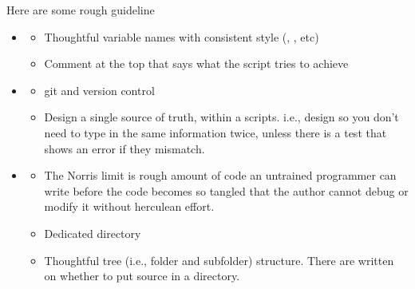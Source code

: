 \documentclass[letterpaper,10pt,english]{sphinxmanual}
\begin{document}
\sphinxAtStartPar
Here are some rough guideline
\begin{itemize}
\item {} \begin{description}
\begin{itemize}
\item {} 
\sphinxAtStartPar
Thoughtful variable names with consistent style (, , etc)

\item {} 
\sphinxAtStartPar
Comment at the top that says what the script tries to achieve

\end{itemize}

\end{description}

\item {} \begin{description}
\begin{itemize}
\item {} 
\sphinxAtStartPar
git and version control

\item {} 
\sphinxAtStartPar
Design a single source of truth, within a scripts. i.e., design so you don’t need to type in the same information twice, unless there is a test that shows an error if they mismatch.

\end{itemize}

\end{description}

\item {} \begin{description}
\begin{itemize}
\item {} 
\sphinxAtStartPar
The Norris limit is rough amount of code an untrained programmer can write before the code becomes so tangled that the author cannot debug or modify it without herculean effort.

\item {} 
\sphinxAtStartPar
Dedicated  directory

\item {} 
\sphinxAtStartPar
Thoughtful tree (i.e., folder and subfolder) structure. There are  written on whether to put source in a  directory.


\end{itemize}
\end{description}
\end{itemize}
\end{document}
